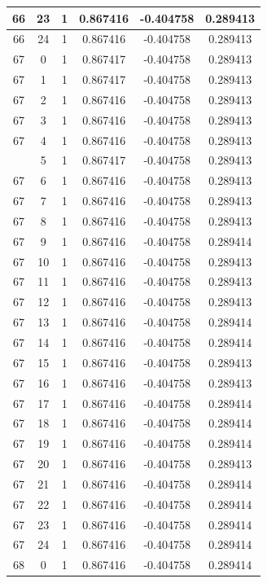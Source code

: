 \documentclass[12pt,a4paper]{article}
\numberwithin{equation}{section}
\numberwithin{figure}{section}
\numberwithin{table}{section}
\begin{document}
\begin{longtable}{|c|c|c|c|c|c|}
66 & 23 & 1 & 0.867416 & -0.404758 & 0.289413 \\ \hline
66 & 24 & 1 & 0.867416 & -0.404758 & 0.289413 \\ \hline
67 & 0 & 1 & 0.867417 & -0.404758 & 0.289413 \\ \hline
67 & 1 & 1 & 0.867417 & -0.404758 & 0.289413 \\ \hline
67 & 2 & 1 & 0.867416 & -0.404758 & 0.289413 \\ \hline
67 & 3 & 1 & 0.867416 & -0.404758 & 0.289413 \\ \hline
67 & 4 & 1 & 0.867416 & -0.404758 & 0.289413 \\ \hline
\pagebreak
67 & 5 & 1 & 0.867417 & -0.404758 & 0.289413 \\ \hline
67 & 6 & 1 & 0.867416 & -0.404758 & 0.289413 \\ \hline
67 & 7 & 1 & 0.867416 & -0.404758 & 0.289413 \\ \hline
67 & 8 & 1 & 0.867416 & -0.404758 & 0.289413 \\ \hline
67 & 9 & 1 & 0.867416 & -0.404758 & 0.289414 \\ \hline
67 & 10 & 1 & 0.867416 & -0.404758 & 0.289413 \\ \hline
67 & 11 & 1 & 0.867416 & -0.404758 & 0.289413 \\ \hline
67 & 12 & 1 & 0.867416 & -0.404758 & 0.289413 \\ \hline
67 & 13 & 1 & 0.867416 & -0.404758 & 0.289414 \\ \hline
67 & 14 & 1 & 0.867416 & -0.404758 & 0.289414 \\ \hline
67 & 15 & 1 & 0.867416 & -0.404758 & 0.289413 \\ \hline
67 & 16 & 1 & 0.867416 & -0.404758 & 0.289413 \\ \hline
67 & 17 & 1 & 0.867416 & -0.404758 & 0.289414 \\ \hline
67 & 18 & 1 & 0.867416 & -0.404758 & 0.289414 \\ \hline
67 & 19 & 1 & 0.867416 & -0.404758 & 0.289414 \\ \hline
67 & 20 & 1 & 0.867416 & -0.404758 & 0.289413 \\ \hline
67 & 21 & 1 & 0.867416 & -0.404758 & 0.289414 \\ \hline
67 & 22 & 1 & 0.867416 & -0.404758 & 0.289414 \\ \hline
67 & 23 & 1 & 0.867416 & -0.404758 & 0.289414 \\ \hline
67 & 24 & 1 & 0.867416 & -0.404758 & 0.289414 \\ \hline
68 & 0 & 1 & 0.867416 & -0.404758 & 0.289414 \\ \hline

\end{longtable}
\end{document}
